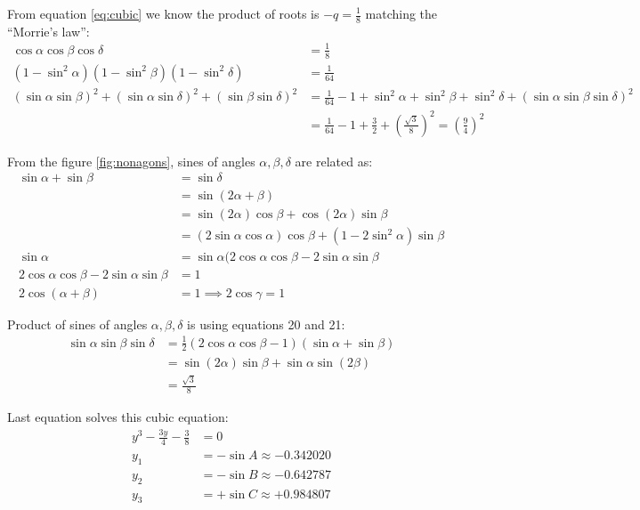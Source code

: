 \documentclass[11pt]{article}
\begin{document}
From equation \ref{eq:cubic} we know the product of roots is $-q = \frac{1}{8}$
matching the ``Morrie's law'':
\begin{align}
\cos\alpha\cos\beta\cos\delta &= \frac{1}{8} \\
(1-\sin^2\alpha)(1-\sin^2\beta)(1-\sin^2\delta) &= \frac{1}{64} \nonumber\\
(\sin\alpha\sin\beta)^2 +(\sin\alpha\sin\delta)^2 +(\sin\beta\sin\delta)^2 &= \frac{1}{64} - 1 +\sin^2\alpha+\sin^2\beta+\sin^2\delta +(\sin\alpha\sin\beta\sin\delta)^2 \nonumber\\
 &= \frac{1}{64} - 1 + \frac{3}{2} +\left(\frac{\sqrt{3}}{8}\right)^2 = \left(\frac{9}{4}\right)^2 
\end{align}

From the figure \ref{fig:nonagons}, sines of angles $\alpha, \beta, \delta$ are related as:
\begin{align}
\sin\alpha + \sin\beta &= \sin\delta \\
 &= \sin(2\alpha + \beta) \nonumber\\
 &= \sin(2\alpha)\cos\beta + \cos(2\alpha)\sin\beta \nonumber\\
 &= (2\sin\alpha\cos\alpha)\cos\beta + (1-2\sin^2\alpha)\sin\beta \nonumber\\
\sin\alpha &= \sin\alpha(2\cos\alpha\cos\beta -2\sin\alpha\sin\beta \nonumber\\
2\cos\alpha\cos\beta -2\sin\alpha\sin\beta &= 1 \\
2\cos(\alpha+\beta) &= 1 \implies 2\cos\gamma = 1 \nonumber
\end{align}

Product of sines of angles $\alpha, \beta, \delta$ is using equations 20 and 21:
\begin{align}
\sin\alpha\sin\beta\sin\delta &= \frac{1}{2}(2\cos\alpha\cos\beta - 1)(\sin\alpha + \sin\beta) \nonumber\\
 &= \sin(2\alpha)\sin\beta + \sin\alpha\sin(2\beta) \nonumber\\
 &= \frac{\sqrt{3}}{8}
\end{align}



Last equation solves this cubic equation:
\begin{align*}
y^3 - \frac{3y}{4} - \frac{3}{8} &= 0\\
y_1 &= -\sin{A} \approx -0.342020\\
y_2 &= -\sin{B} \approx -0.642787\\
y_3 &= +\sin{C} \approx +0.984807
\end{align*}
\end{document}

